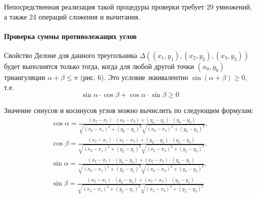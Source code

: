 \documentclass{fefu}
\begin{document}
Непосредственная реализация такой процедуры проверки требует 29 умножений, а также 24 операций  сложения и вычитания.
\paragraph{Проверка суммы противолежащих углов}
Свойство Делоне для данного треугольника $\Delta \left((x_1, y_1), (x_2, y_2), (x_3, y_3)\right)$ будет выполнятся
только тогда, когда для любой другой точки $(x_0, y_0)$ триангуляции $\alpha + \beta \leq \pi$ (рис. 6). Это условие
эквивалентно $\sin\left(\alpha + \beta\right) \geq 0$, т.е.
\[
    \sin\alpha \cdot \cos\beta + \cos\alpha \cdot \sin\beta \geq 0
\]

Значение синусов и косинусов углов можно вычислить по следующим формулам:
\[
    \begin{matrix}
        \cos\alpha = \frac{(x_0 - x_1)\cdot(x_0 - x_3) + (y_0 - y_1)\cdot(y_0 - y_3)}{\sqrt{(x_0 - x_1)^2 + (y_0 - y_1)^2}
    \sqrt{(x_0 - x_3)^2 + (y_0 - y_3)^2}},\\
    \cos\beta = \frac{(x_2 - x_1)\cdot(x_2 - x_3) + (y_2 - y_1)\cdot(y_2 - y_3)}{\sqrt{(x_2 - x_1)^2 + (y_2 - y_1)^2}
    \sqrt{(x_2 - x_3)^2 + (y_2 - y_3)^2}},\\
    \sin\alpha = \frac{(x_0 - x_1)\cdot(y_0 - y_3) + (x_0 - x_3)\cdot(y_0 - y_1)}{\sqrt{(x_0 - x_1)^2 + (y_0 - y_1)^2}
    \sqrt{(x_0 - x_3)^2 + (y_0 - y_3)^2}},\\
    \sin\beta = \frac{(x_2 - x_1)\cdot(y_2 - y_3) + (x_2 - x_3)\cdot(y_2 - y_1)}{\sqrt{(x_2 - x_1)^2 + (y_2 - y_1)^2}
    \sqrt{(x_2 - x_3)^2 + (y_2 - y_3)^2}}
    \end{matrix}
\]
\end{document}
